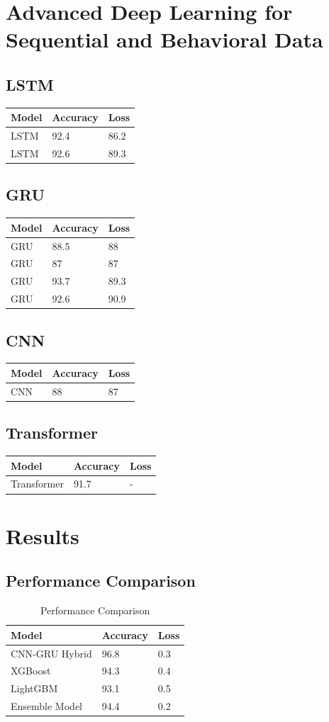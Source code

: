 \documentclass[twocolumn]{svjour3}
\begin{document}
\section{Advanced Deep Learning for Sequential and Behavioral Data}
\subsection{LSTM}
\begin{tabular}{lll}
\hline
Model & Accuracy & Loss \\
\hline
LSTM & 92.4 & 86.2 \\
LSTM & 92.6 & 89.3 \\
\hline
\end{tabular}
\subsection{GRU}
\begin{tabular}{lll}
\hline
Model & Accuracy & Loss \\
\hline
GRU & 88.5 & 88 \\
GRU & 87 & 87 \\
GRU & 93.7 & 89.3 \\
GRU & 92.6 & 90.9 \\
\hline
\end{tabular}
\subsection{CNN}
\begin{tabular}{lll}
\hline
Model & Accuracy & Loss \\
\hline
CNN & 88 & 87 \\
\hline
\end{tabular}
\subsection{Transformer}
\begin{tabular}{lll}
\hline
Model & Accuracy & Loss \\
\hline
Transformer & 91.7 & - \\
\hline
\end{tabular}

\section{Results}
\subsection{Performance Comparison}
\begin{table}
\centering
\caption{Performance Comparison}
\begin{tabular}{lll}
\hline
Model & Accuracy & Loss \\
\hline
CNN-GRU Hybrid & 96.8 & 0.3 \\
XGBoost & 94.3 & 0.4 \\
LightGBM & 93.1 & 0.5 \\
Ensemble Model & 94.4 & 0.2 \\
\hline
\end{tabular}
\end{table}
\end{document}
